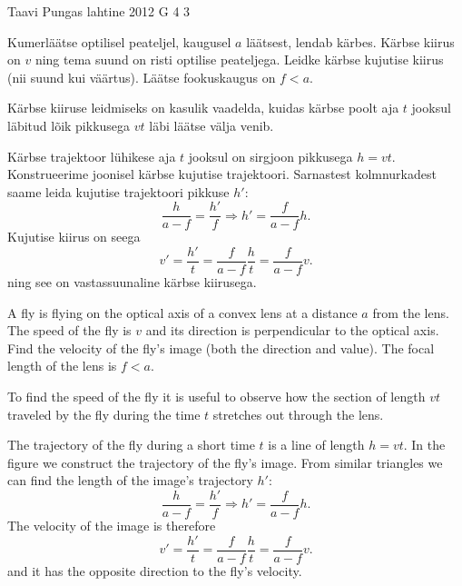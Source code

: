 {Taavi Pungas} %
{lahtine} %
{2012} %
{G 4} %
{3} %
{
\ifStatement
Kumerläätse optilisel peateljel, kaugusel $a$ läätsest, lendab kärbes.
Kärbse kiirus on $v$ ning tema suund on risti optilise peateljega.
Leidke kärbse kujutise kiirus (nii suund kui väärtus). Läätse
fookuskaugus on $f < a$.
\fi


\ifHint
Kärbse kiiruse leidmiseks on kasulik vaadelda, kuidas kärbse poolt aja $t$ jooksul läbitud lõik pikkusega $vt$ läbi läätse välja venib.
\fi


\ifSolution
Kärbse trajektoor lühikese aja $t$ jooksul on sirgjoon pikkusega $h=vt$. Konstrueerime joonisel kärbse kujutise trajektoori. Sarnastest kolmnurkadest saame leida kujutise trajektoori pikkuse $h'$:
$$\frac{h}{a-f}=\frac{h'}{f} \Rightarrow h'=\frac{f}{a-f} h.$$
Kujutise kiirus on seega
$$v' = \frac{h'}{t} = \frac{f}{a-f} \frac{h}{t} = \frac{f}{a-f} v. $$
ning see on vastassuunaline kärbse kiirusega.
\fi


\ifEngStatement
A fly is flying on the optical axis of a convex lens at a distance $a$ from the lens. The speed of the fly is $v$ and its direction is perpendicular to the optical axis. Find the velocity of the fly’s image (both the direction and value). The focal length of the lens is $f < a$.
\fi


\ifEngHint
To find the speed of the fly it is useful to observe how the section of length $vt$ traveled by the fly during the time $t$ stretches out through the lens.
\fi


\ifEngSolution
The trajectory of the fly during a short time $t$ is a line of length $h=vt$. In the figure we construct the trajectory of the fly’s image. From similar triangles we can find the length of the image’s trajectory $h'$:
$$\frac{h}{a-f}=\frac{h'}{f} \Rightarrow h'=\frac{f}{a-f} h.$$ 
The velocity of the image is therefore
$$v' = \frac{h'}{t} = \frac{f}{a-f} \frac{h}{t} = \frac{f}{a-f} v. $$ 
and it has the opposite direction to the fly’s velocity.
\fi
}